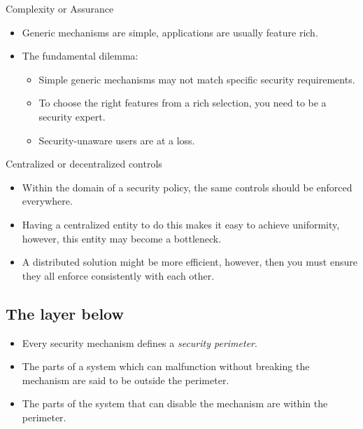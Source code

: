 \begin{frame}
  \begin{block}{Complexity or Assurance}
    \begin{itemize}
      \item Generic mechanisms are simple, applications are usually feature rich.

      \item The fundamental dilemma:
        \begin{itemize}
          \item Simple generic mechanisms may not match specific security 
            requirements.

          \item To choose the right features from a rich selection, you need to 
            be a security expert.

          \item Security-unaware users are at a loss.
        \end{itemize}
    \end{itemize}
  \end{block}
\end{frame}

\begin{frame}
  \begin{block}{Centralized or decentralized controls}
    \begin{itemize}
      \item Within the domain of a security policy, the same controls should be 
        enforced everywhere.

      \item Having a centralized entity to do this makes it easy to achieve 
        uniformity, however, this entity may become a bottleneck.

      \item A distributed solution might be more efficient, however, then you 
        must ensure they all enforce consistently with each other.
    \end{itemize}
  \end{block}
\end{frame}

\subsection{The layer below}

\begin{frame}
  \begin{itemize}
    \item Every security mechanism defines a \emph{security perimeter}.

    \item The parts of a system which can malfunction without breaking the 
      mechanism are said to be outside the perimeter.

    \item The parts of the system that can disable the mechanism are within the 
      perimeter.
  \end{itemize}
\end{frame}

